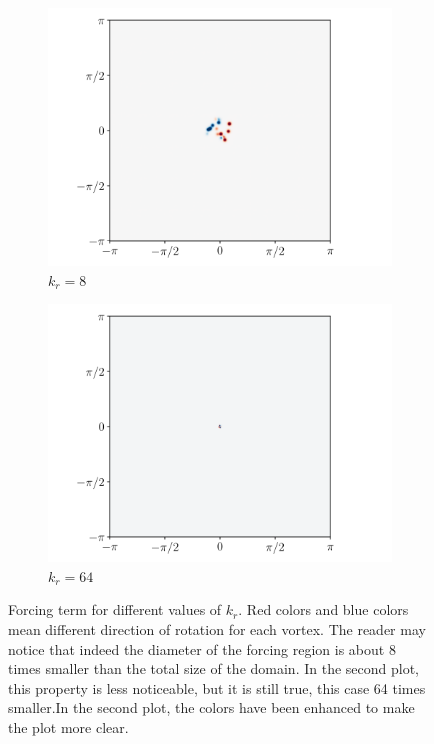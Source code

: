 \documentclass[../main.tex]{subfiles}
\begin{document}
\begin{figure}[ht]
	\centering
	\begin{subfigure}{0.49\textwidth}
		\centering
		\includegraphics[width=\textwidth]{images/forcing32_8.pdf}
		\caption{$k_r = 8$}
	\end{subfigure}
	\begin{subfigure}{0.49\textwidth}
		\centering
		\includegraphics[width=\textwidth]{images/forcing32_64.pdf}
		\caption{$k_r = 64$}
	\end{subfigure}
	\caption{Forcing term for different values of $k_r$. Red colors and blue colors mean different direction of rotation for each vortex. The reader may notice that indeed the diameter of the forcing region is about 8 times smaller than the total size of the domain. In the second plot, this property is less noticeable, but it is still true, this case 64 times smaller.In the second plot, the colors have been enhanced to make the plot more clear.}
	\label{fig:forcing}
\end{figure}
\end{document}

